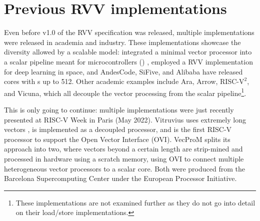 \section{Previous RVV implementations}
Even before v1.0 of the RVV specification was released, multiple implementations were released in academia and industry.
These implementations showcase the diversity allowed by a scalable model: \citeauthor{johnsMinimalRISCVVector2020} integrated a minimal vector processor into a scalar pipeline meant for microcontrollers () \cite{johnsMinimalRISCVVector2020}, \citeauthor{dimascioOnBoardDecisionMaking2021} employed a RVV implementation for deep learning in space\cite{dimascioOnBoardDecisionMaking2021}, and AndesCode, SiFive, and Alibaba have released cores with s up to 512\cite{AndesCoreNX27VProcessor}.
Other academic examples include Ara\cite{cavalcanteAra1GHzScalable2020}, Arrow\cite{assirArrowRISCVVector2021}, RISC-$\text{V}^2$\cite{patsidisRISCV2ScalableRISCV2020}, and Vicuna\cite{platzerVicunaTimingPredictableRISCV2021}, which all decouple the vector processing from the scalar pipeline\footnote{These implementations are not examined further as they do not go into detail on their load/store implementations.}.

This is only going to continue: multiple implementations were just recently presented at RISC-V Week in Paris (May 2022).
Vitruvius\cite{minerviniVitruviusAreaEfficientRISCV2022} uses extremely long vectors , is implemented as a decoupled processor, and is the first RISC-V processor to support the Open Vector Interface (OVI)\cite{semidynamicsSemidynamicsOpenVectorInterface2022}.
VecProM\cite{mahaleRISCVVPUVery2021} splits its approach into two, where vectors beyond a certain length are strip-mined and processed in hardware using a scratch memory, using OVI to connect multiple heterogeneous vector processors to a scalar core.
Both were produced from the Barcelona Supercomputing Center under the European Processor Initiative.

